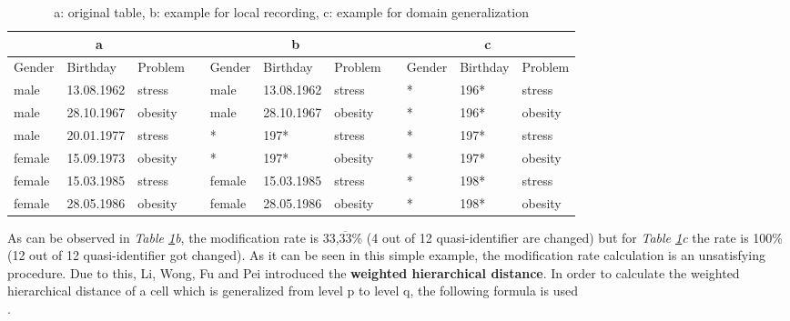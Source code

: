 \documentclass{llncs}
\begin{document}
	
\begin{table}[]
	\centering
	\caption{a: original table, b: example for local recording, c: example for domain generalization }
	\label{table_distortion}
	\begin{tabular}{@{}lllllllllll@{}}
		\multicolumn{3}{c}{\textbf{a}} &           & \multicolumn{3}{c}{\textbf{b}} &  & \multicolumn{3}{c}{\textbf{c}} \\ \midrule
		Gender  & Birthday   & Problem & \textbf{} & Gender  & Birthday   & Problem &  & Gender  & Birthday  & Problem  \\ \midrule
		male    & 13.08.1962 & stress  &           & male    & 13.08.1962 & stress  &  & *       & 196*      & stress   \\
		male    & 28.10.1967 & obesity &           & male    & 28.10.1967 & obesity &  & *       & 196*      & obesity  \\
		male    & 20.01.1977 & stress  &           & *       & 197*       & stress  &  & *       & 197*      & stress   \\
		female  & 15.09.1973 & obesity &           & *       & 197*       & obesity &  & *       & 197*      & obesity  \\
		female  & 15.03.1985 & stress  &           & female  & 15.03.1985 & stress  &  & *       & 198*      & stress   \\
		female  & 28.05.1986 & obesity &           & female  & 28.05.1986 & obesity &  & *       & 198*      & obesity  \\ \bottomrule
	\end{tabular}
\end{table}

As can be observed in \textit{Table \ref{table_distortion}b}, the modification rate is  33,$\overline{33}$\% (4 out of 12 quasi-identifier are changed) but for \textit{Table \ref{table_distortion}c} the rate is 100\% (12 out of 12 quasi-identifier got changed). As it can be seen in this simple example, the modification rate calculation is an unsatisfying procedure. Due to this, Li, Wong, Fu and Pei introduced the \textbf{weighted hierarchical distance}. In order to calculate the weighted hierarchical distance of a cell which is generalized from level p to level q, the following formula is used\\

\cite{li2006achieving}.\\
\end{document}
